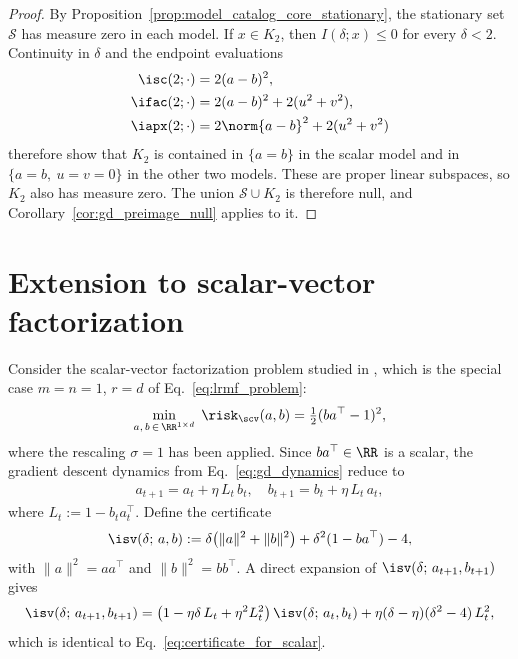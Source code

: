 \documentclass{article}
\begin{document}
\begin{proof}
By Proposition~\ref{prop:model_catalog_core_stationary}, the stationary set
$\mathcal S$ has measure zero in each model. If $x\in K_2$, then
$I(\delta;x)\le 0$ for every $\delta<2$. Continuity in $\delta$ and the endpoint
evaluations
\begin{align}
\isc(2;\cdot)&=2(a-b)^2,\\
\ifac(2;\cdot)&=2(a-b)^2+2(u^2+v^2),\\
\iapx(2;\cdot)&=2\norm{a-b}^2+2(u^2+v^2)
\end{align}
therefore show that $K_2$ is contained in $\{a=b\}$ in the scalar model and in
$\{a=b,\ u=v=0\}$ in the other two models. These are proper linear subspaces,
so $K_2$ also has measure zero. The union $\mathcal S\cup K_2$ is therefore
null, and Corollary~\ref{cor:gd_preimage_null} applies to it.
\end{proof}

\section{Extension to scalar-vector factorization}
\label{app:scalar_vector_proof}
Consider the scalar-vector factorization problem studied in \cite{liang2025gradient},
which is the special case $m = n = 1$, $r = d$ of  Eq.~\eqref{eq:lrmf_problem}:
\begin{align}
    \min_{a,\, b \,\in\, \RR^{1 \times d}} \;\risk_\scv(a,b) = \tfrac{1}{2}(ba^\top - 1)^2,
\end{align}
where the rescaling $\sigma = 1$ has been applied. Since $ba^\top \in \RR$ is a scalar,
the gradient descent dynamics from  Eq.~\eqref{eq:gd_dynamics} reduce to
\begin{align}
    a_{t+1} = a_t + \eta\, L_t\, b_t, \quad
    b_{t+1} = b_t + \eta\, L_t\, a_t,
    \label{eq:sv_gd}
\end{align}
where $L_t := 1 - b_t a_t^\top$. Define the certificate
\begin{align}
    \isv(\delta;\, a, b) := \delta\bigl(\|a\|^2 + \|b\|^2\bigr)
    + \delta^2(1 - ba^\top) - 4,
\end{align}
with $\|a\|^2 = aa^\top$ and $\|b\|^2 = bb^\top$.
A direct expansion of $\isv(\delta;\, a_{t+1}, b_{t+1})$ gives
\begin{align}\label{eq:sv_affine}
    \isv(\delta;\, a_{t+1}, b_{t+1})
    = \bigl(1 - \eta\delta\, L_t + \eta^2 L_t^2\bigr)\,\isv(\delta;\, a_t, b_t)
    + \eta(\delta - \eta)(\delta^2 - 4)\,L_t^2,
\end{align}
which is identical to  Eq.~\eqref{eq:certificate_for_scalar}.
\end{document}
